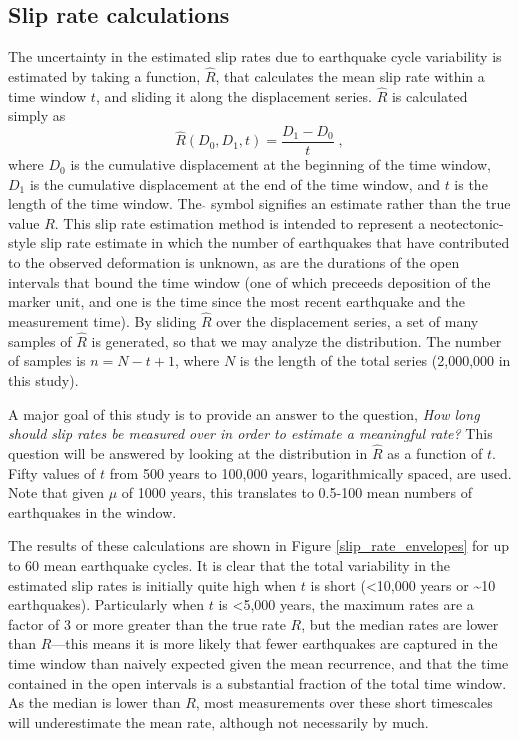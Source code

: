 \documentclass[se, manuscript]{copernicus}
\begin{document}
\subsection{Slip rate calculations}\label{slip-rate-calculations}

The uncertainty in the estimated slip rates due to earthquake cycle
variability is estimated by taking a function, \(\hat{R}\), that
calculates the mean slip rate within a time window \(t\), and sliding it
along the displacement series. \(\hat{R}\) is calculated simply as
\begin{equation}
  \hat{R}(D_0,D_1,t) = \frac{D_1 - D_0}{t}\; ,
  \label{eqn-rate-calc}
\end{equation}
where \(D_0\) is the cumulative displacement at the beginning of the
time window, \(D_1\) is the cumulative displacement at the end of the
time window, and \(t\) is the length of the time window. The \(\hat{}\)
symbol signifies an estimate rather than the true value \(R\). This slip rate
estimation method is intended to represent a neotectonic-style slip rate
estimate in which the number of earthquakes that have contributed to the
observed deformation is unknown, as are the durations of the open intervals that
bound the time window (one of which preceeds deposition of the marker unit, and
one is the time since the most recent earthquake and the measurement time).
By sliding \(\hat{R}\) over the displacement series, a set of many samples of
\(\hat{R}\) is generated, so that we may analyze the distribution. The number
of samples is \(n = N - t + 1\), where \(N\) is the length of the total
series (2,000,000 in this study).

A major goal of this study is to provide an answer to the question, \emph{How
long should slip rates be measured over in order to estimate a meaningful
rate?} This question will be answered by looking at the distribution in
\(\hat{R}\) as a function of \(t\). Fifty values of \(t\) from 500 years to
100,000 years, logarithmically spaced, are used. Note that given \(\mu\) of
1000 years, this translates to 0.5-100 mean numbers of earthquakes in the
window.

The results of these calculations are shown in Figure
\ref{slip_rate_envelopes} for up to 60 mean earthquake cycles. It is clear
that the total variability in the estimated slip rates is initially quite
high when \(t\) is short (\textless{}10,000 years or \textasciitilde{}10
earthquakes). Particularly when \(t\) is \textless{}5,000 years, the maximum
rates are a factor of 3 or more greater than the true rate \(R\), but the
median rates are lower than \(R\)---this means it is more likely that fewer
earthquakes are captured in the time window than naively expected given the
mean recurrence, and that the time contained in the open intervals is a
substantial fraction of the total time window. As the median is lower than
\(R\), most measurements over these short timescales will underestimate the
mean rate, although not necessarily by much.
\end{document}
